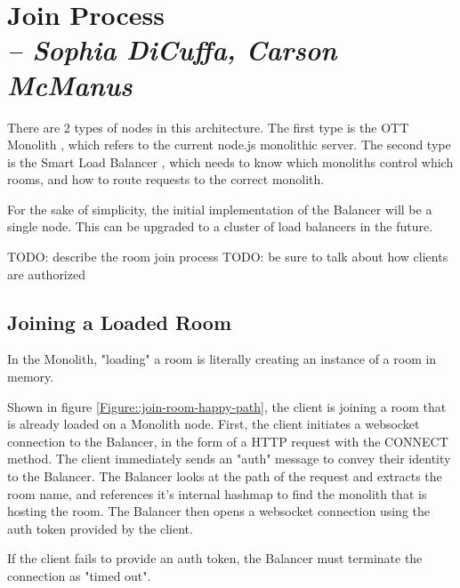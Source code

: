 \chapter{Join Process \\
  \small{\textit{-- Sophia DiCuffa, Carson McManus}}
  \label{Chapter::JoinProcess}}

There are 2 types of nodes in this architecture. The first type is the OTT Monolith , which refers to the current node.js monolithic server. The second type is the Smart Load Balancer , which needs to know which monoliths control which rooms, and how to route requests to the correct monolith.

For the sake of simplicity, the initial implementation of the Balancer will be a single node. This can be upgraded to a cluster of load balancers in the future.


TODO: describe the room join process
TODO: be sure to talk about how clients are authorized

\section{Joining a Loaded Room }

In the Monolith, "loading" a room is literally creating an instance of a room in memory.

Shown in figure \ref{Figure::join-room-happy-path}, the client is joining a room that is already loaded on a Monolith node. First, the client initiates a websocket  connection to the Balancer, in the form of a HTTP request with the CONNECT method. The client immediately sends an "auth" message to convey their identity to the Balancer. The Balancer looks at the path of the request and extracts the room name, and references it's internal hashmap to find the monolith that is hosting the room. The Balancer then opens a websocket connection using the auth token provided by the client.

If the client fails to provide an auth token, the Balancer must terminate the connection as "timed out".

